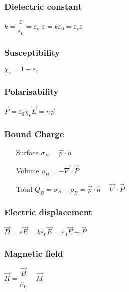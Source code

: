 \subsubsection{Dielectric constant}
\begin{itemize}
\itemt \( k = \dfrac{\varepsilon}{\varepsilon_0} = \varepsilon_r \)
\itemt \( \varepsilon = k\varepsilon_0 = \varepsilon_r \varepsilon\)
\end{itemize}

\subsubsection{Susceptibility}
\begin{itemize}
\itemt \( \chi_e = 1-\varepsilon_r \)
\end{itemize}

\subsubsection{Polarisability}
\begin{itemize}
\itemt \( \vec{P} = \varepsilon_0\chi_e\vec{E} = n\vec{p} \)
\end{itemize}

\subsubsection{Bound Charge}
\begin{itemize}
\item[Surface] 
\itemt \( \sigma_B = \vec{p}\cdot\hat{n} \)
\item[Volume]
\itemt \( \rho_B = -\vec{\nabla}\cdot\vec{P} \)
\item[Total]
\itemt \( Q_B = \sigma_B + \rho_B = \vec{p}\cdot\hat{n} -\vec{\nabla}\cdot\vec{P} \)
\end{itemize}

\subsubsection{Electric displacement}
\begin{itemize}
\itemt \( \vec{D} = \varepsilon \vec{E} = k\varepsilon_0 \vec{E} = \varepsilon_0\vec{E} + \vec{P} \)
\end{itemize}

\subsubsection{Magnetic field}
\begin{itemize}
\itemt \( \vec{H} = \dfrac{\vec{B}}{\mu_0} - \vec{M} \)
\end{itemize}

